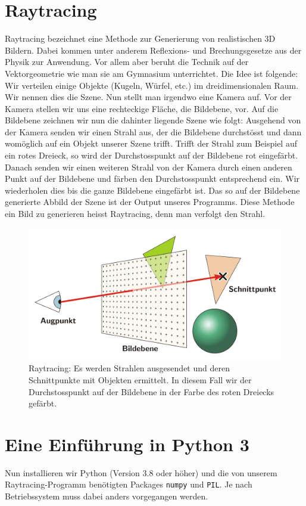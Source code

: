 \documentclass[12pt,a4paper]{article}
\theoremstyle{definition}
\theoremstyle{definition}
\begin{document}
\section{Raytracing}
Raytracing bezeichnet eine Methode zur Generierung von realistischen 3D Bildern.
Dabei kommen unter anderem Reflexions- und Brechungsgesetze aus der Physik zur Anwendung.
Vor allem aber beruht die Technik auf der Vektorgeometrie wie man sie am Gymnasium unterrichtet.
Die Idee ist folgende: Wir verteilen einige Objekte (Kugeln, Würfel, etc.) im dreidimensionalen Raum.
Wir nennen dies die Szene.
Nun stellt man irgendwo eine Kamera auf.
Vor der Kamera stellen wir uns eine rechteckige Fläche, die Bildebene, vor.
Auf die Bildebene zeichnen wir nun die dahinter liegende Szene wie folgt:
Ausgehend von der Kamera senden wir einen Strahl aus, der die Bildebene durchstösst und dann womöglich auf ein Objekt unserer Szene trifft.
Trifft der Strahl zum Beispiel auf ein rotes Dreieck, so wird der Durchstosspunkt auf der Bildebene rot eingefärbt.
Danach senden wir einen weiteren Strahl von der Kamera durch einen anderen Punkt auf der Bildebene und färben den Durchstosspunkt entsprechend ein.
Wir wiederholen dies bis die ganze Bildebene eingefärbt ist.
Das so auf der Bildebene generierte Abbild der Szene ist der Output unseres Programms.
Diese Methode ein Bild zu generieren heisst Raytracing, denn man verfolgt den Strahl.
\begin{figure}[h!]
	\centering
	\includegraphics[width=\textwidth]{images/raytracing.png}
	\caption{Raytracing: Es werden Strahlen ausgesendet und deren Schnittpunkte mit Objekten ermittelt. In diesem Fall wir der Durchstosspunkt auf der Bildebene in der Farbe des roten Dreiecks gefärbt.}
	\label{fig:raytracing}
\end{figure}

\section{Eine Einführung in Python 3}\label{sec:einfuerung}
Nun installieren wir Python (Version 3.8 oder höher) und die von unserem Raytracing-Programm benötigten Packages \texttt{numpy} und \texttt{PIL}.
Je nach Betriebssystem muss dabei anders vorgegangen werden.
\end{document}
